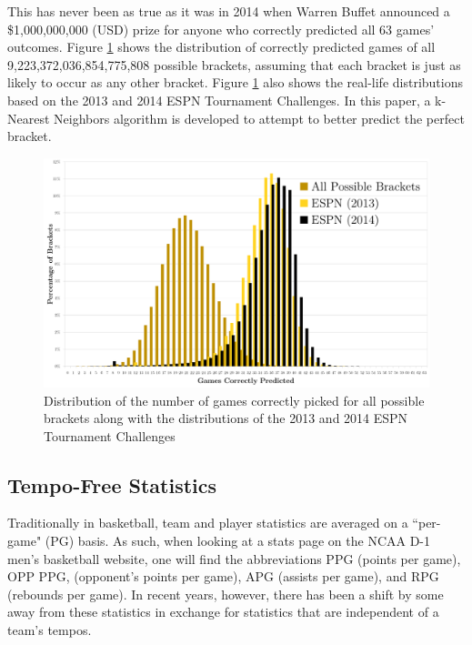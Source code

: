 \documentclass[5p, preprint]{elsarticle}
\begin{document}
This has never been as true as it was in 2014 when Warren Buffet announced a \$1,000,000,000 (USD) prize for anyone who correctly predicted all 63 games' outcomes. Figure \ref{pic:distro} shows the distribution of correctly predicted games of all 9,223,372,036,854,775,808 possible brackets, assuming that each bracket is just as likely to occur as any other bracket. Figure \ref{pic:distro} also shows the real-life distributions based on the 2013 and 2014 ESPN Tournament Challenges. In this paper, a k-Nearest Neighbors algorithm is developed to attempt to better predict the perfect bracket.

\begin{figure}[!t]
\centering
\includegraphics[width=6.5in]{distro2.png}
\caption{Distribution of the number of games correctly picked for all possible brackets along with the distributions of the 2013 and 2014 ESPN Tournament Challenges}
\label{pic:distro}
\end{figure}

\vspace*{-.1in}

\subsection*{Tempo-Free Statistics}

Traditionally in basketball, team and player statistics are averaged on a ``per-game" (PG) basis. As such, when looking at a stats page on the NCAA D-1 men's basketball website, one will find the abbreviations PPG (points per game),  OPP PPG, (opponent's points per game), APG (assists per game), and RPG (rebounds per game).  In recent years, however, there has been a shift by some away from these statistics in exchange for statistics that are independent of a team's tempos. 
\end{document}
